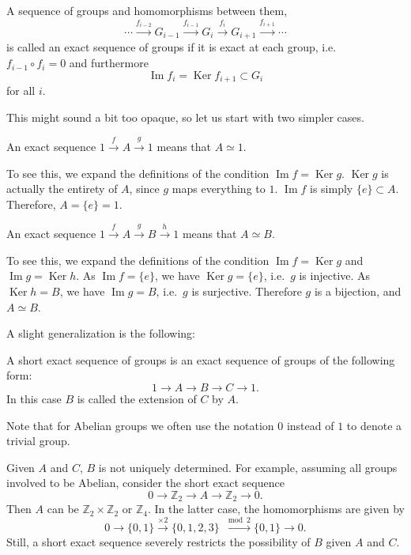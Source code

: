 \documentclass[12pt]{article}
\numberwithin{equation}{section}
\theoremstyle{remark}
\def\bZ{\mathbb{Z}}
\def\Ker{\mathop{\mathrm{Ker}}}
\def\Im{\mathop{\mathrm{Im}}}
\begin{document}
\begin{definition}
  A sequence of groups and homomorphisms between them, \begin{equation}
  \cdots 
  \stackrel{f_{i-2}}{\longrightarrow} G_{i-1} 
  \stackrel{f_{i-1}}{\longrightarrow} G_{i}
  \stackrel{f_{i}}{\longrightarrow} G_{i+1}
  \stackrel{f_{i+1}}{\longrightarrow} \cdots
  \end{equation}
is called an exact sequence of groups if it is exact at each group, i.e.~
$f_{i-1}\circ f_i=0$ and furthermore 
\begin{equation}
 \Im f_{i}  = \Ker f_{i+1} \subset G_i \label{eq:exactness}
\end{equation}
for all $i$.
\end{definition}

This might sound a bit too opaque, so let us start with two simpler cases.
\begin{proposition}
  An exact sequence $1\stackrel{f}{\to} A\stackrel{g}{\to} 1$ means that $A\simeq 1$.
\end{proposition}
To see this, we expand the definitions of the condition $\Im f=\Ker g$.
$\Ker g$ is actually the entirety of $A$, since $g$ maps everything to $1$.
$\Im f$ is simply $\{e\}\subset A$.
Therefore, $A=\{e\}=1$.

\begin{proposition}
An exact sequence $1\stackrel{f}{\to} A\stackrel{g}{\to} B\stackrel{h}{\to} 1$ means that $A\simeq B$.
\end{proposition}
To see this, we expand the definitions of the condition $\Im f=\Ker g$ and $\Im g=\Ker h$.
As $\Im f=\{e\}$, we have $\Ker g=\{e\}$, i.e.~$g$ is injective.
As $\Ker h=B$, we have $\Im g=B$, i.e.~$g$ is surjective.
Therefore $g$ is a bijection, and $A\simeq B$.


A slight generalization is the following:
\begin{definition}
  A short exact sequence of groups is an exact sequence of groups of the following form: \begin{equation}
  1 \to A \to B \to C \to 1.
  \end{equation}
  In this case $B$ is called the extension of $C$ by $A$.
\end{definition}
Note that for Abelian groups we often use the notation $0$ instead of $1$
to denote a trivial group.

Given $A$ and $C$, $B$ is not uniquely determined.
For example, assuming all groups involved to be Abelian,
consider the short exact sequence \begin{equation}
  0 \to \bZ_2 \to A \to \bZ_2 \to 0.
\end{equation}  
Then $A$ can be $\bZ_2\times \bZ_2$ or $\bZ_4$.
In the latter case, the homomorphisms are given by \begin{equation}
0 \to \{0,1\} \xrightarrow{\times 2} \{0,1,2,3\} \xrightarrow{\mod 2} \{0,1\} \to 0.
\end{equation}
Still, a short exact sequence severely restricts the possibility of $B$ given $A$ and $C$.
\end{document}
